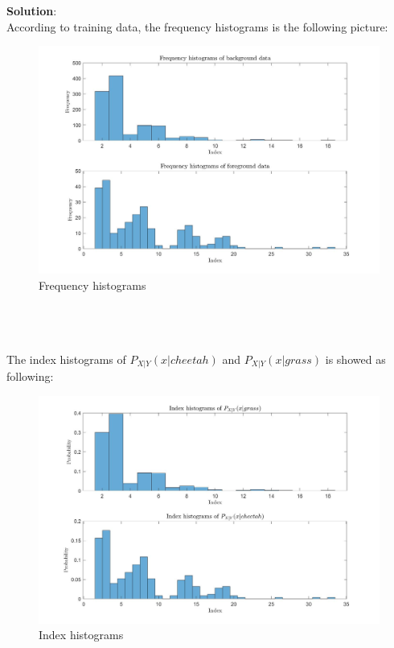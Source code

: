 \documentclass[12pt,letterpaper]{article}
\begin{document}
\begin{enumerate}[a)]
        \textbf{Solution}:\\
        According to training data, the frequency histograms is the following picture:
        \begin{figure}[h]
            \centering
            \includegraphics[scale=0.2]{Images/histograms1.jpg}
            \caption{Frequency histograms}
        \end{figure}\\
        \\
        \\
        The index histograms of $P_{X|Y}(x|cheetah)$ and $P_{X|Y}(x|grass)$ is showed as following:
        \begin{figure}[h]
            \centering
            \includegraphics[scale=0.2]{Images/histograms2.jpg}
            \caption{Index histograms}
        \end{figure}


\end{enumerate}
\end{document}
